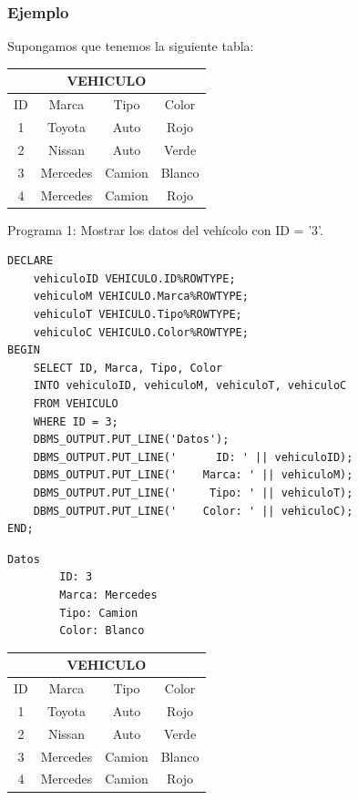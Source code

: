 \documentclass{templateNote}
\begin{document}
\subsubsection{Ejemplo}
Supongamos que tenemos la siguiente tabla:
\begin{center}
    \begin{tabular}{|c|c|c|c|}
        \hline
        \multicolumn{4}{|c|}{VEHICULO} \\ \hline
        ID & Marca & Tipo & Color \\
        \hline
        1 & Toyota & Auto & Rojo \\
        2 & Nissan & Auto & Verde \\
        3 & Mercedes & Camion & Blanco \\
        4 & Mercedes & Camion & Rojo \\
        \hline
    \end{tabular}
\end{center}
Programa 1: Mostrar los datos del veh\'icolo con ID = '3'.
\begin{tcolorbox}[
    colframe=Morado!100, %
    colback=Morado!20,       %
    coltitle=white!100, %
    title=\textbf{PL/SQL}, %
]
    \begin{verbatim}
DECLARE
    vehiculoID VEHICULO.ID%ROWTYPE;
    vehiculoM VEHICULO.Marca%ROWTYPE;
    vehiculoT VEHICULO.Tipo%ROWTYPE;
    vehiculoC VEHICULO.Color%ROWTYPE;
BEGIN
    SELECT ID, Marca, Tipo, Color
    INTO vehiculoID, vehiculoM, vehiculoT, vehiculoC
    FROM VEHICULO
    WHERE ID = 3;
    DBMS_OUTPUT.PUT_LINE('Datos');
    DBMS_OUTPUT.PUT_LINE('      ID: ' || vehiculoID);
    DBMS_OUTPUT.PUT_LINE('    Marca: ' || vehiculoM);
    DBMS_OUTPUT.PUT_LINE('     Tipo: ' || vehiculoT);
    DBMS_OUTPUT.PUT_LINE('    Color: ' || vehiculoC);
END;
    \end{verbatim}
\end{tcolorbox}
\begin{tcolorbox}[
    colframe=Morado!100, %
    colback=Morado!20,       %
    coltitle=white!100, %
    title=\textbf{Resultado}, %
]
    \begin{verbatim}
Datos
        ID: 3
        Marca: Mercedes
        Tipo: Camion
        Color: Blanco
    \end{verbatim}
\end{tcolorbox}
\begin{center}
    \begin{tabular}{|c|c|c|c|}
        \hline
        \multicolumn{4}{|c|}{VEHICULO} \\ \hline
        ID & Marca & Tipo & Color \\
        \hline
        1 & Toyota & Auto & Rojo \\
        2 & Nissan & Auto & Verde \\
        \rowcolor{green}3 & Mercedes & Camion & Blanco \\
        4 & Mercedes & Camion & Rojo \\
        \hline
    \end{tabular}
\end{center}
\end{document}
